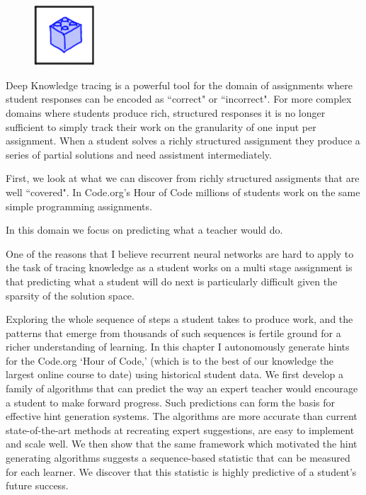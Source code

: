 \begin{figure}[h!]
\includegraphics[width=0.2\textwidth]{img/assnType_2}
\end{figure}

Deep Knowledge tracing is a powerful tool for the domain of assignments where student responses can be encoded as ``correct" or ``incorrect". For more complex domains where students produce rich, structured responses it is no longer sufficient to simply track their work on the granularity of one input per assignment. When a student solves a richly structured assignment they produce a series of partial solutions and need assistment intermediately.

First, we look at what we can discover from richly structured assigments that are well ``covered". In Code.org's Hour of Code millions of students work on the same simple programming assignments. 

In this domain we focus on predicting what a teacher would do.

One of the reasons that I believe recurrent neural networks are hard to apply to the task of tracing knowledge as a student works on a multi stage assignment is that predicting what a student will do next is particularly difficult given the sparsity of the solution space.

Exploring the whole sequence of steps a student takes to produce work, and the patterns that emerge from thousands of such sequences is fertile ground for a richer understanding of learning. In this chapter I autonomously generate hints for the Code.org `Hour of Code,' (which is to the best of our knowledge the largest online course to date) using historical student data. We first develop a family of algorithms that can predict the way an expert teacher would encourage a student to make forward progress. Such predictions can form the basis for effective hint generation systems. The algorithms are more accurate than current state-of-the-art methods at recreating expert suggestions, are easy to implement and scale well. We then show that the same framework which motivated the hint generating algorithms suggests a sequence-based statistic that can be measured for each learner. We discover that this statistic is highly predictive of a student's future success. 

